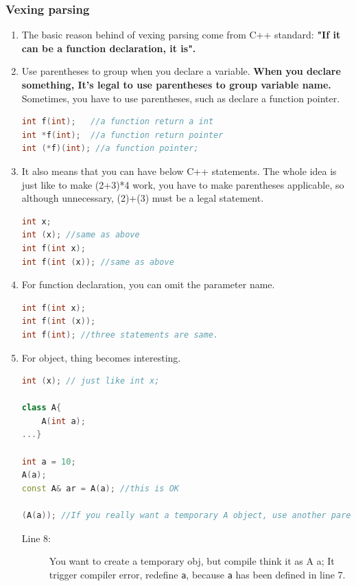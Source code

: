 \documentclass[a4paper,11pt,twoside]{book}
\begin{document}
\subsubsection{Vexing parsing}
\begin{enumerate}
	\item The basic reason behind of vexing parsing come from C++ standard: \textbf{"If it can be a function declaration, it is".}
	
	\item Use parentheses to group when you declare a variable. \textbf{When you declare something, It's legal to use parentheses to group variable name.} Sometimes, you have to use parentheses, such as declare a function pointer. 
\begin{lstlisting}[frame=single, language=c++, mathescape=true]
int f(int);   //a function return a int
int *f(int);  //a function return pointer
int (*f)(int); //a function pointer;  
\end{lstlisting}
	
	\item It also means that you can have below C++ statements. The whole idea is just like to make (2+3)*4 work, you have to make parentheses applicable, so although unnecessary, (2)+(3) must be a legal statement.
\begin{lstlisting}[frame=single, language=c++, mathescape=true]
int x;
int (x); //same as above
int f(int x);
int f(int (x)); //same as above
\end{lstlisting}
	
	\item For function declaration, you can omit the parameter name.  
\begin{lstlisting}[frame=single, language=c++, mathescape=true]
int f(int x);
int f(int (x));
int f(int); //three statements are same. 
\end{lstlisting}
	
	\item For object, thing becomes interesting.
\begin{lstlisting}[frame=single, language=c++, mathescape=true]
int (x); // just like int x;

class A{
	A(int a);
...}
	
int a = 10; 
A(a);
const A& ar = A(a); //this is OK

(A(a)); //If you really want a temporary A object, use another parentheses. 
\end{lstlisting}
\begin{description}
	\item[Line 8:] You want to create a temporary obj, but compile think it as A a; It trigger compiler error, redefine \texttt{a}, because \texttt{a} has been defined in line 7.
\end{description}
	

\end{enumerate}
\end{document}
